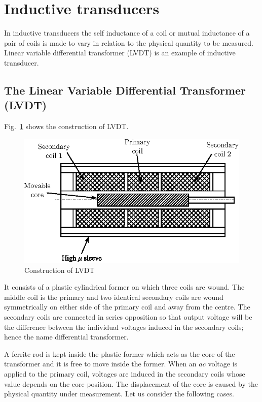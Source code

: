 \section{Inductive transducers}\label{sec8.11}

In inductive transducers the self inductance of a coil or mutual inductance of a pair of coils is made to vary in relation to the physical quantity to be measured. Linear variable differential transformer (LVDT) is an example of inductive transducer.\\[-20pt]

\subsection{The Linear Variable Differential Transformer (LVDT)}

Fig.~\ref{fig8.14} shows the construction of LVDT.
\begin{figure}[H]
\centering
\includegraphics{chap8/fig8.14.eps}
\caption{Construction of LVDT}\label{fig8.14}
\end{figure}

It consists of a plastic cylindrical former on which three coils are wound. The middle coil is the primary and two identical secondary coils are wound symmetrically on either side of the primary coil and away from the centre. The secondary coils are connected in series opposition so that output voltage will be the difference between the individual voltages induced in the secondary coils;
hence the name differential transformer. 

A ferrite rod is kept inside the plastic former which acts as the core of the transformer and it is free to move inside the former. When an $ac$ voltage is applied to the primary coil, voltages are induced in the secondary coils whose value depends on the core position. The displacement of the core is caused by the physical quantity under measurement. Let us consider the following cases.

